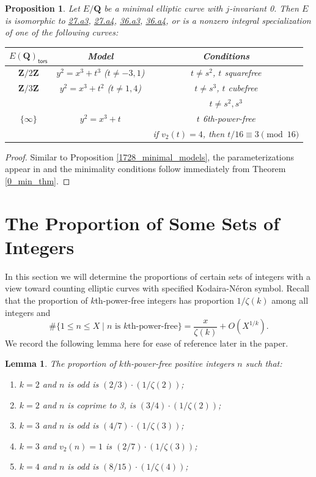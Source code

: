 \documentclass{amsart}
\newcommand{\Z}{\mathbf{Z}}
\newcommand{\Q}{\mathbf{Q}}
\newcommand{\tors}{\mathsf{tors}}
\numberwithin{equation}{section}
\theoremstyle{plain}
\newtheorem{lem}[equation]{Lemma}
\newtheorem{prop}[equation]{Proposition}
\theoremstyle{remark}
\begin{document}
\begin{prop} \label{j0_min_prop}
Let $E/\Q$ be a minimal elliptic curve with $j$-invariant 0.  Then $E$ is isomorphic to \href{https://beta.lmfdb.org/EllipticCurve/Q/27/a/3}{27.a3}, \href{https://beta.lmfdb.org/EllipticCurve/Q/27/a/4}{27.a4}, \href{https://beta.lmfdb.org/EllipticCurve/Q/36/a/3}{36.a3}, \href{https://beta.lmfdb.org/EllipticCurve/Q/36/a/4}{36.a4}, or is a nonzero integral specialization of one of the following curves:
\begin{center}
\begin{tabular}{|c|c|c|}
\hline
$E(\Q)_\tors$ & Model&  Conditions \\
\hline
$\Z/2\Z$ & $y^2 = x^3+t^3$ ($t \ne -3,1$)  & $t \ne s^2$, $t$ squarefree \\
\hline
$\Z/3\Z$ & $y^2 = x^3 + t^2$ ($t \ne 1, 4$) & $t \ne s^3$, $t$ cubefree \\
\hline
 & & $t \ne s^2, s^3$ \\
$\lbrace \infty \rbrace$& $y^2 = x^3 + t$ & $t$ 6th-power-free \\
&& if $v_2(t) = 4$, then $t/16 \equiv 3 \pmod{16}$ \\
\hline
\end{tabular}
\end{center}
\end{prop}

\begin{proof}
Similar to Proposition \ref{1728_minimal_models}, the parameterizations appear in \cite[Table 5]{clz} and the minimality conditions follow immediately from Theorem \ref{0_min_thm}.
\end{proof}

\section{The Proportion of Some Sets of Integers}

In this section we will determine the proportions of certain sets of integers with a view toward counting elliptic curves with specified Kodaira-N\'eron symbol.  Recall that the proportion of $k$th-power-free integers has proportion $1/\zeta(k)$ among all integers and
\[
\#\lbrace 1 \leq n \leq X \mid n \text{ is $k$th-power-free} \rbrace = \frac{x}{\zeta(k)} + O(X^{1/k}).
\]
We record the following lemma here for ease of reference later in the paper.

\begin{lem} \label{squarefree}
The proportion of $k$th-power-free positive integers $n$ such that:
\begin{enumerate}
\item $k=2$ and $n$ is odd is $(2/3) \cdot (1/\zeta(2))$; \label{odd_sqf}
\item $k=2$ and $n$ is coprime to 3, is $(3/4) \cdot (1/\zeta(2))$;
\item $k=3$ and $n$ is odd is $(4/7) \cdot (1/\zeta(3))$;
\item $k=3$ and $v_2(n)=1$ is $(2/7) \cdot (1/\zeta(3))$;
\item $k=4$ and $n$ is odd is $(8/15) \cdot (1/\zeta(4))$;
\end{enumerate} 
\end{lem}
\end{document}
